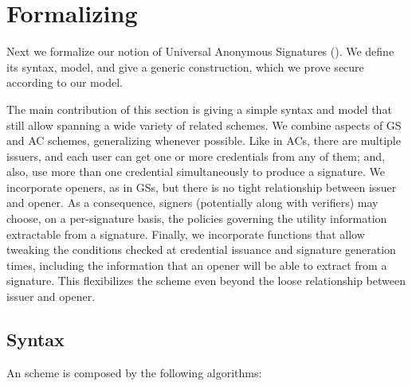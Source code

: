 \section{Formalizing \UAS}
\label{sec:formal-uas}


Next we formalize our notion of Universal Anonymous Signatures
(\UAS). We define its syntax, model, and give a generic construction, which
we prove secure according to our model. 

The main contribution of this section is giving a simple syntax and model that
still allow spanning a wide variety of related schemes. We combine aspects of GS
and AC schemes, generalizing whenever possible. Like in ACs, there are multiple
issuers, and each user can get one or more credentials from any of them; and,
also, use more than one credential simultaneously to produce a signature. We
incorporate openers, as in GSs, but there is no tight relationship between
issuer and opener. As a consequence, signers (potentially along with verifiers)
may choose, on a per-signature basis, the policies governing the utility
information extractable from a signature. Finally, we incorporate functions that
allow tweaking the conditions checked at credential issuance and signature
generation times, including the information that an opener will be able to
extract from a signature. This flexibilizes the scheme even beyond the loose
relationship between issuer and opener.

\subsection{Syntax}
\label{ssec:syntax-uas}

An \UAS scheme is composed by the following algorithms:

